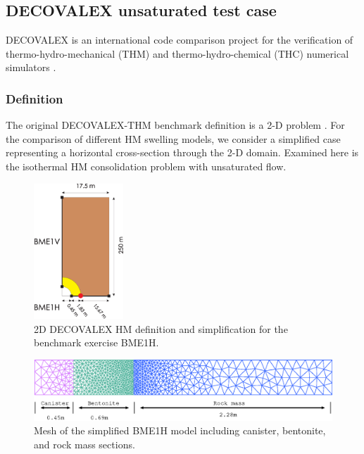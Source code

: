 \subsection{DECOVALEX unsaturated test case}
DECOVALEX is an international code comparison project for the verification of thermo-hydro-mechanical (THM) and thermo-hydro-chemical (THC) numerical simulators \cite{BirEtAl:2008}.

\subsubsection*{Definition}
The original DECOVALEX-THM benchmark definition is a 2-D problem \cite{BirEtAl:2008}. For the comparison of different HM swelling models, we consider a simplified case representing a horizontal cross-section through the 2-D domain. Examined here is the isothermal HM consolidation problem with unsaturated flow.

\begin{figure}[!t]
\begin{center}
\includegraphics[width=0.3\textwidth]{chapter_14/figures/fig_14_2_15}
\end{center}
\caption{2D DECOVALEX HM definition and simplification for the benchmark exercise BME1H.}
\label{fig:thm-1D}
\end{figure}

\begin{figure}[!t]
\begin{center}
\includegraphics[width=1.0\textwidth]{chapter_14/figures/fig_14_2_16}
\end{center}
\caption{Mesh of the simplified BME1H model including canister, bentonite, and rock mass sections.}
\label{fig:thm-1Dmesh}
\end{figure}

